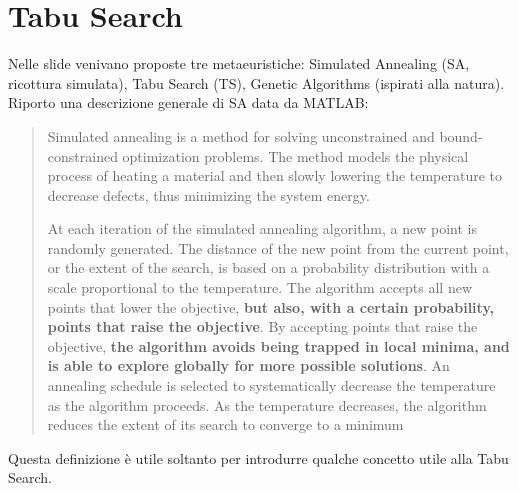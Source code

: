 \section{Tabu Search}
Nelle slide venivano proposte tre metaeuristiche: Simulated Annealing (SA, ricottura simulata), Tabu Search (TS), Genetic Algorithms (ispirati alla natura).
Riporto una descrizione generale di SA data da MATLAB:
\begin{quote}
	Simulated annealing is a method for solving unconstrained and bound-constrained optimization problems. The method models the physical process of heating a material and then slowly lowering the temperature to decrease defects, thus minimizing the system energy.
	
	At each iteration of the simulated annealing algorithm, a new point is randomly generated. The distance of the new point from the current point, or the extent of the search, is based on a probability distribution with a scale proportional to the temperature. The algorithm accepts all new points that lower the objective, \textbf{but also, with a certain probability, points that raise the objective}. By accepting points that raise the objective, \textbf{the algorithm avoids being trapped in local minima, and is able to explore globally for more possible solutions}. An annealing schedule is selected to systematically decrease the temperature as the algorithm proceeds. As the temperature decreases, the algorithm reduces the extent of its search to converge to a minimum
\end{quote}
Questa definizione è utile soltanto per introdurre qualche concetto utile alla Tabu Search. 

